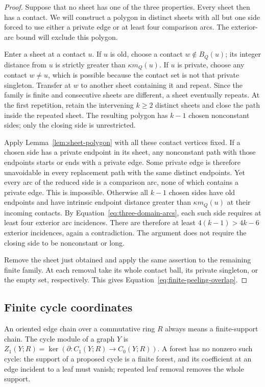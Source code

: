 \begin{proof}
Suppose that no sheet has one of the three properties.  Every sheet
then has a contact.  We will construct a polygon in distinct sheets with
all but one side forced to use either a private edge or at least four
comparison arcs.  The exterior-arc bound will exclude this polygon.

Enter a sheet at a contact $u$.  If $u$ is old,
choose a contact $w\notin B_Q(u)$; its integer distance from $u$ is
strictly greater than $\kappa m_Q(u)$.  If $u$ is private, choose any
contact $w\ne u$, which is possible because the contact set is not
that private singleton.  Transfer at $w$ to another sheet containing
it and repeat.  Since the family is finite and consecutive sheets
are different, a sheet eventually repeats.  At the first repetition,
retain the intervening $k\geq2$ distinct sheets and close the path
inside the repeated sheet.  The resulting polygon has $k-1$ chosen
nonconstant sides; only the closing side is unrestricted.

Apply Lemma~\ref{lem:sheet-polygon} with all these contact vertices
fixed.  If a chosen side has a private endpoint in its sheet, any
nonconstant path with those endpoints starts or ends with a private
 edge.  Some private edge is therefore unavoidable in every replacement
 path with the same distinct endpoints.  Yet every arc of the reduced
side is a comparison arc, none of which contains a private edge.
This is impossible.  Otherwise all $k-1$ chosen sides have old
endpoints and have intrinsic endpoint distance greater than
$\kappa m_Q(u)$ at their incoming contacts.  By
Equation~\eqref{eq:three-domain-arcs}, each such side requires at least
four exterior arc incidences.  There are therefore at least
$4(k-1)>4k-6$ exterior incidences, again a contradiction.  The argument
does not require the closing side to be nonconstant or long.

Remove the sheet just obtained and apply the same assertion to the
remaining finite family.  At each removal take its whole contact ball,
its private singleton, or the empty set, respectively.  This gives
Equation~\eqref{eq:finite-peeling-overlap}.
\end{proof}

\subsection{Finite cycle coordinates}

An oriented edge chain over a commutative ring $R$ always means a
finite-support chain.  The cycle module of a graph $Y$ is
$Z_1(Y;R)=\ker(\partial:C_1(Y;R)\to C_0(Y;R))$.  A forest has no
nonzero such cycle: the support of a proposed cycle is a finite forest,
and its coefficient at an edge incident to a leaf must vanish; repeated
leaf removal removes the whole support.

